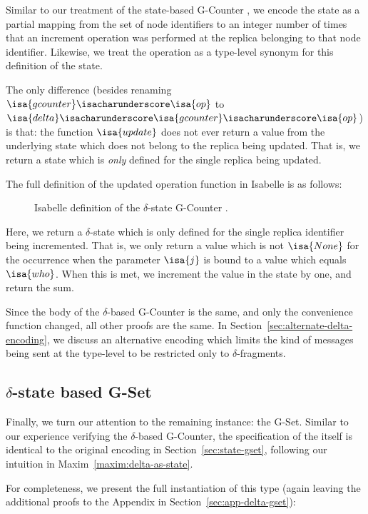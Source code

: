 Similar to our treatment of the state-based G-Counter \CRDT, we encode the state
as a partial mapping from the set of node identifiers to an integer number of
times that an increment operation was performed at the replica belonging to that
node identifier. Likewise, we treat the operation as a type-level synonym for
this definition of the state.

The only difference (besides renaming $\isa{gcounter}\isacharunderscore\isa{op}$
to $\isa{delta}\isacharunderscore\isa{gcounter}\isacharunderscore\isa{op}$) is
that: the function $\isa{update}$ does not ever return a value from the
underlying state which does not belong to the replica being updated. That is, we
return a state which is \emph{only} defined for the single replica being
updated.

The full definition of the updated operation function in Isabelle is as follows:

\begin{figure}[H]
  
  \caption{Isabelle definition of the $\delta$-state G-Counter \CRDT.}
\end{figure}

Here, we return a $\delta$-state which is only defined for the single replica
identifier being incremented. That is, we only return a value which is not
$\isa{None}$ for the occurrence when the parameter $\isa{j}$ is bound to a value
which equals $\isa{who}$. When this is met, we increment the value in the state
by one, and return the sum.

Since the body of the $\delta$-based G-Counter \CRDT is the same, and only the
convenience function changed, all other proofs are the same. In
Section~\ref{sec:alternate-delta-encoding}, we discuss an alternative encoding
which limits the kind of messages being sent at the type-level to be restricted
only to $\delta$-fragments.

\subsection{$\delta$-state based G-Set}

Finally, we turn our attention to the remaining \CRDT instance: the G-Set.
Similar to our experience verifying the $\delta$-based G-Counter, the
specification of the \CRDT itself is identical to the original encoding in
Section~\ref{sec:state-gset}, following our intuition in
Maxim~\ref{maxim:delta-as-state}.

For completeness, we present the full instantiation of this type (again leaving
the additional proofs to the Appendix in Section~\ref{sec:app-delta-gset}):

